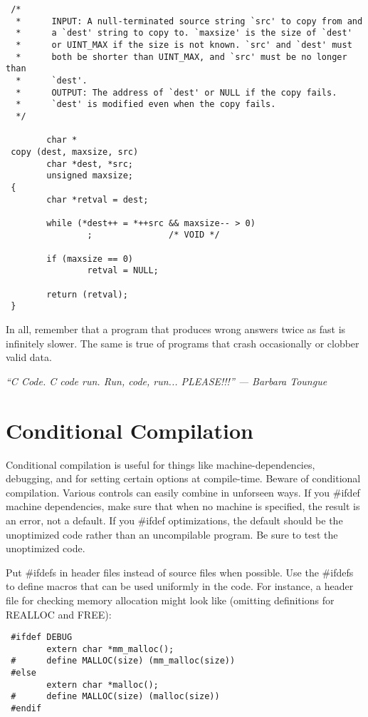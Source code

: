 \begin{verbatim}
 /*
  *      INPUT: A null-terminated source string `src' to copy from and
  *      a `dest' string to copy to. `maxsize' is the size of `dest'
  *      or UINT_MAX if the size is not known. `src' and `dest' must
  *      both be shorter than UINT_MAX, and `src' must be no longer than
  *      `dest'.
  *      OUTPUT: The address of `dest' or NULL if the copy fails.
  *      `dest' is modified even when the copy fails.
  */

        char *
 copy (dest, maxsize, src)
        char *dest, *src;
        unsigned maxsize;
 {
        char *retval = dest;

        while (*dest++ = *++src && maxsize-- > 0)
                ;               /* VOID */

        if (maxsize == 0)
                retval = NULL;

        return (retval);
 }
\end{verbatim}

 In all, remember that a program that produces wrong answers twice as fast is
infinitely slower. The same is true of programs that crash occasionally or
clobber valid data. 

{\em ``C Code. C code run. Run, code, run... PLEASE!!!'' ---  Barbara Toungue}
\newpage
\section{Conditional Compilation}

 Conditional compilation is useful for things like machine-dependencies,
debugging, and for setting certain options at compile-time. Beware of
conditional compilation. Various controls can easily combine in unforseen
ways. If you \#ifdef machine dependencies, make sure that when no machine is
specified, the result is an error, not a default. If you \#ifdef optimizations,
the default should be the unoptimized code rather than an uncompilable program.
Be sure to test the unoptimized code. 

 Put \#ifdefs in header files instead of source files when possible. Use the
\#ifdefs to define macros that can be used uniformly in the code. For instance,
a header file for checking memory allocation might look like (omitting
definitions for REALLOC and FREE): 

\begin{verbatim}
 #ifdef DEBUG
        extern char *mm_malloc();
 #      define MALLOC(size) (mm_malloc(size))
 #else
        extern char *malloc();
 #      define MALLOC(size) (malloc(size))
 #endif 
\end{verbatim}

